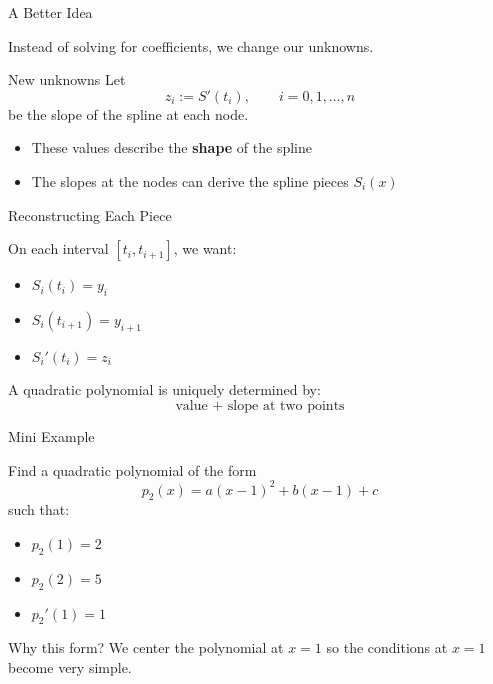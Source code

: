 \documentclass[10pt]{beamer}
\begin{document}
\begin{frame}{A Better Idea}

Instead of solving for coefficients, we change our unknowns.

\bigskip

\begin{block}{New unknowns}
Let
\[
z_i := S'(t_i), \qquad i=0,1,\dots,n
\]
be the slope of the spline at each node.
\end{block}

\begin{itemize}

\item These values describe the \textbf{shape} of the spline

\item The slopes at the nodes can derive the spline pieces $S_i(x)$

\end{itemize}


\end{frame}
\begin{frame}{Reconstructing Each Piece}

On each interval $[t_i,t_{i+1}]$, we want:

\begin{itemize}
\item $S_i(t_i) = y_i$
\item $S_i(t_{i+1}) = y_{i+1}$
\item $S_i'(t_i) = z_i$
\end{itemize}

\bigskip

A quadratic polynomial is uniquely determined by:
\[
\text{value + slope at two points}
\]

\bigskip


\end{frame}
\begin{frame}{Mini Example}

\begin{example}
Find a quadratic polynomial of the form
\[
p_2(x)=a(x-1)^2 + b(x-1) + c
\]
such that:
\begin{itemize}
    \item $p_2(1)=2$
    \item $p_2(2)=5$
    \item $p_2'(1)=1$
\end{itemize}
\end{example}

\pause

\begin{block}{Why this form?}
We center the polynomial at $x=1$ so the conditions at $x=1$
become very simple.
\end{block}

\end{frame}
\end{document}
